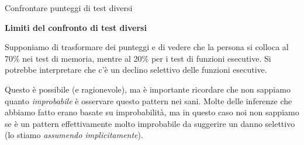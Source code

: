 \documentclass[
  ignorenonframetext,
]{beamer}
\begin{document}
\begin{frame}{Confrontare punteggi di test diversi}
\label{confrontare-punteggi-di-test-diversi-3}
\begin{center}
  \textbf{Limiti del confronto di test diversi}
\end{center}
\vspace{2em}

Supponiamo di trasformare dei punteggi e di vedere che la persona si
colloca al 70\% nei test di memoria, mentre al 20\% per i test di
funzioni esecutive. Si potrebbe interpretare che c'è un declino
selettivo delle funzioni esecutive.

Questo è possibile (e ragionevole), ma è importante ricordare che non
sappiamo quanto \emph{improbabile} è osservare questo pattern nei sani.
Molte delle inferenze che abbiamo fatto erano basate su improbabilità,
ma in questo caso noi non sappiamo se è un pattern effettivamente molto
improbabile da suggerire un danno selettivo (lo stiamo \emph{assumendo
implicitamente}).
\end{frame}
\end{document}
